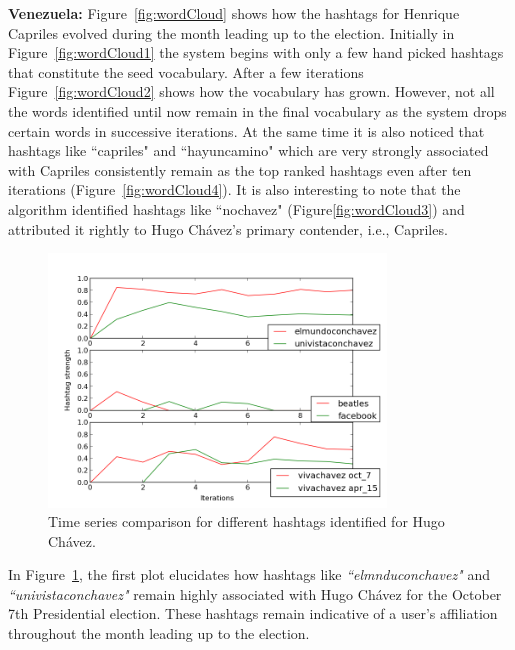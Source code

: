 \noindent
{\bf Venezuela:} %
Figure~\ref{fig:wordCloud} shows how the hashtags for Henrique Capriles evolved during the month leading up to the election.
Initially in Figure~\ref{fig:wordCloud1} the system begins with only a few hand picked hashtags that constitute the seed vocabulary. 
After a few iterations Figure~\ref{fig:wordCloud2} shows how the vocabulary has grown.
However, not all the words identified until now remain in the final vocabulary as the system drops certain words in successive iterations.
At the same time it is also noticed that hashtags like ``capriles" and ``hayuncamino" which are very strongly associated with Capriles consistently remain as the top ranked hashtags even after ten iterations (Figure~\ref{fig:wordCloud4}). 
It is also interesting to note that the algorithm identified hashtags like ``nochavez" (Figure\ref{fig:wordCloud3}) and attributed it rightly to Hugo Ch\'{a}vez's primary contender, i.e., Capriles. 
\begin{figure}[Ht]
	\centering
	\includegraphics[height=0.25\textheight, width=0.80\textwidth]{support_files/hashTagTimeSeries.png}
	\caption{Time series comparison for different hashtags identified for Hugo Ch\'{a}vez.}
	\label{fig:timeSeries}
\end{figure}
In Figure~\ref{fig:timeSeries}, the first plot elucidates how hashtags like \emph{``elmnduconchavez"} and 
\emph{``univistaconchavez"} remain highly associated with Hugo Ch\'{a}vez for the October 7th Presidential election. 
These hashtags remain indicative of a user's affiliation throughout the month leading up to the election.
